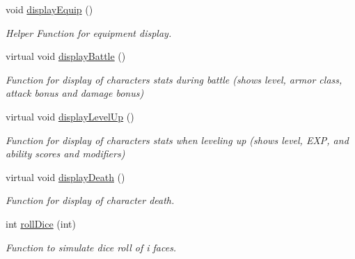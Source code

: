 \begin{DoxyCompactItemize}
void \hyperlink{class_characters_acf1c5f4228c0ac33361c0ad5211aa7a9}{display\+Equip} ()
\begin{DoxyCompactList}\small\item\em Helper Function for equipment display. \end{DoxyCompactList}\item 
\hypertarget{class_characters_ad40703d40e67cf8d99e4de9624c1ba8a}{}\label{class_characters_ad40703d40e67cf8d99e4de9624c1ba8a} 
virtual void \hyperlink{class_characters_ad40703d40e67cf8d99e4de9624c1ba8a}{display\+Battle} ()
\begin{DoxyCompactList}\small\item\em Function for display of character\textquotesingle{}s stats during battle (shows level, armor class, attack bonus and damage bonus) \end{DoxyCompactList}\item 
\hypertarget{class_characters_a99a811e64beaa78d8d1bd5186199e174}{}\label{class_characters_a99a811e64beaa78d8d1bd5186199e174} 
virtual void \hyperlink{class_characters_a99a811e64beaa78d8d1bd5186199e174}{display\+Level\+Up} ()
\begin{DoxyCompactList}\small\item\em Function for display of character\textquotesingle{}s stats when leveling up (shows level, E\+XP, and ability scores and modifiers) \end{DoxyCompactList}\item 
\hypertarget{class_characters_a021d59a971cf527cb15a3978faa19c63}{}\label{class_characters_a021d59a971cf527cb15a3978faa19c63} 
virtual void \hyperlink{class_characters_a021d59a971cf527cb15a3978faa19c63}{display\+Death} ()
\begin{DoxyCompactList}\small\item\em Function for display of character death. \end{DoxyCompactList}\item 
\hypertarget{class_characters_afa9c56654b160d186ce3fd8259f8f180}{}\label{class_characters_afa9c56654b160d186ce3fd8259f8f180} 
int \hyperlink{class_characters_afa9c56654b160d186ce3fd8259f8f180}{roll\+Dice} (int)
\begin{DoxyCompactList}\small\item\em Function to simulate dice roll of i faces. \end{DoxyCompactList}\item 
\hypertarget{class_characters_ad39fbd976f089a631abc4a7c24de38d6}{}\label{class_characters_ad39fbd976f089a631abc4a7c24de38d6} 

\end{DoxyCompactItemize}
